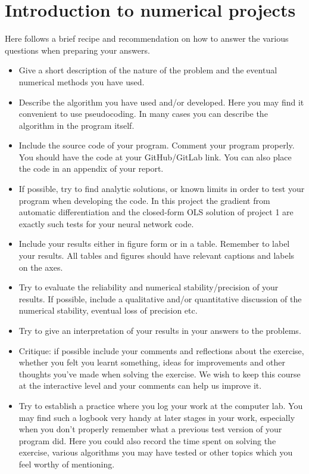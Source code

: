 \documentclass[11pt,a4paper]{article}
\begin{document}
\section*{Introduction to numerical projects}

Here follows a brief recipe and recommendation on how to answer the various
questions when preparing your answers.
\begin{itemize}[nosep]
  \item Give a short description of the nature of the problem and the
        eventual numerical methods you have used.
  \item Describe the algorithm you have used and/or developed.  Here you may
        find it convenient to use pseudocoding.  In many cases you can
        describe the algorithm in the program itself.
  \item Include the source code of your program.  Comment your program
        properly.  You should have the code at your GitHub/GitLab link.  You
        can also place the code in an appendix of your report.
  \item If possible, try to find analytic solutions, or known limits in order
        to test your program when developing the code.  In this project the
        gradient from automatic differentiation and the closed-form OLS
        solution of project 1 are exactly such tests for your neural network
        code.
  \item Include your results either in figure form or in a table.  Remember
        to label your results.  All tables and figures should have relevant
        captions and labels on the axes.
  \item Try to evaluate the reliability and numerical stability/precision of
        your results.  If possible, include a qualitative and/or quantitative
        discussion of the numerical stability, eventual loss of precision
        etc.
  \item Try to give an interpretation of your results in your answers to the
        problems.
  \item Critique: if possible include your comments and reflections about the
        exercise, whether you felt you learnt something, ideas for
        improvements and other thoughts you've made when solving the
        exercise.  We wish to keep this course at the interactive level and
        your comments can help us improve it.
  \item Try to establish a practice where you log your work at the computer
        lab.  You may find such a logbook very handy at later stages in your
        work, especially when you don't properly remember what a previous
        test version of your program did.  Here you could also record the
        time spent on solving the exercise, various algorithms you may have
        tested or other topics which you feel worthy of mentioning.
\end{itemize}
\end{document}
